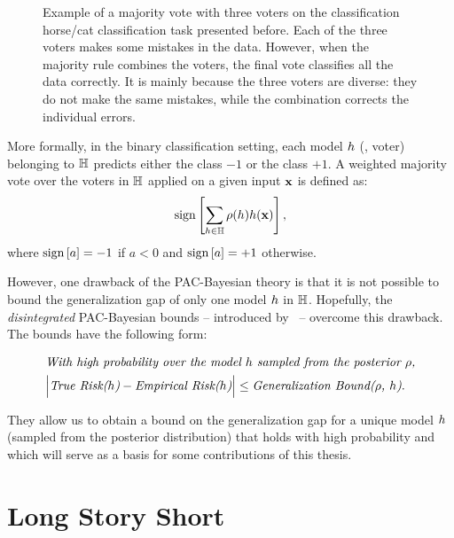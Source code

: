 \begin{figure}
    \centering
    
    \caption[Example of a Majority Vote with Three Voters]{
    Example of a majority vote with three voters on the classification horse/cat classification task presented before.
    Each of the three voters makes some mistakes in the data.
    However, when the majority rule combines the voters, the final vote classifies all the data correctly.
    It is mainly because the three voters are diverse: they do not make the same mistakes, while the combination corrects the individual errors.
    }
    \label{chap:prelim:fig:mv}
\end{figure}
More formally, in the binary classification setting, each model $h$ (\ie, voter) belonging to $\mathbb{H}$ predicts either the class $-1$ or the class $+1$.
A weighted majority vote over the voters in $\mathbb{H}$ applied on a given input $\mathbf{x}$ is defined as:
\begin{align*}
    \operatorname{sign}\left[\sum_{h\in\mathbb{H}} \rho(h) h(\mathbf{x})\right],
\end{align*}
where $\operatorname{sign}\left[ a\right]=-1$ if $a<0$ and $\operatorname{sign}\left[ a\right]=+1$ otherwise.

However, one drawback of the PAC-Bayesian theory is that it is not possible to bound the generalization gap of only one model $h$ in $\mathbb{H}$.
Hopefully, the {\it disintegrated} PAC-Bayesian bounds -- introduced by~\citet{Catoni2007,BlanchardFleuret2007} -- overcome this drawback.
The bounds have the following form: 

\begin{align*}
    &\text{{\it With high probability over the model $h$ sampled from the posterior $\rho$,}}\\
    &\Big| \text{{\it True Risk($h$)}} - \text{{\it Empirical Risk($h$)}}\Big| \le \text{{\it Generalization Bound($\rho$, $h$)}}.
\end{align*}

They allow us to obtain a bound on the generalization gap for a unique model $h$ (sampled from the posterior distribution) that holds with high probability and which will serve as a basis for some contributions of this thesis.

\section*{Long Story Short}

